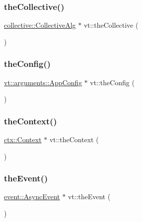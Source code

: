 \mbox{\label{namespacevt_aa8e0c0ab253e7ad1acd5d09e36fea769}} 
\subsubsection{\texorpdfstring{the\+Collective()}{theCollective()}}
{\footnotesize\ttfamily \hyperlink{structvt_1_1collective_1_1_collective_alg}{collective\+::\+Collective\+Alg} $\ast$ vt\+::the\+Collective (\begin{DoxyParamCaption}{ }\end{DoxyParamCaption})}

\mbox{\label{namespacevt_aa17c6eae35e7e41a8b11d4047b7c0839}} 
\subsubsection{\texorpdfstring{the\+Config()}{theConfig()}}
{\footnotesize\ttfamily \hyperlink{structvt_1_1arguments_1_1_app_config}{vt\+::arguments\+::\+App\+Config} $\ast$ vt\+::the\+Config (\begin{DoxyParamCaption}{ }\end{DoxyParamCaption})}

\mbox{\label{namespacevt_a26551fe0e6e6a1371111df5b12c7e92c}} 
\subsubsection{\texorpdfstring{the\+Context()}{theContext()}}
{\footnotesize\ttfamily \hyperlink{structvt_1_1ctx_1_1_context}{ctx\+::\+Context} $\ast$ vt\+::the\+Context (\begin{DoxyParamCaption}{ }\end{DoxyParamCaption})}

\mbox{\label{namespacevt_aa297fcaadc8a330890eb90c5b0081ec5}} 
\subsubsection{\texorpdfstring{the\+Event()}{theEvent()}}
{\footnotesize\ttfamily \hyperlink{structvt_1_1event_1_1_async_event}{event\+::\+Async\+Event} $\ast$ vt\+::the\+Event (\begin{DoxyParamCaption}{ }\end{DoxyParamCaption})}

